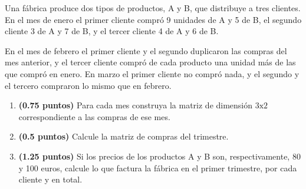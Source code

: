 
Una fábrica produce dos tipos de productos, A y B, que distribuye a tres clientes. En el mes de enero el primer cliente compró 9 unidades de A y 5 de B, el segundo cliente 3 de A y 7 de B, y el tercer cliente 4 de A y 6 de B.

En el mes de febrero el primer cliente y el segundo duplicaron las compras del mes anterior, y el tercer cliente compró de cada producto una unidad más de las que compró en enero. En marzo el primer cliente no compró nada, y el segundo y el tercero compraron lo mismo que en febrero.
\begin{enumerate}[label=\alph*)]
\item \textbf{(0.75 puntos)} Para cada mes construya la matriz de dimensión $3\mathrm{x}2$ correspondiente a las compras de ese mes.
\item \textbf{(0.5 puntos)} Calcule la matriz de compras del trimestre.
\item \textbf{(1.25 puntos)} Si los precios de los productos A y B son, respectivamente, 80 y 100 euros, calcule lo que factura la fábrica en el primer trimestre, por cada cliente y en total.
\end{enumerate}

